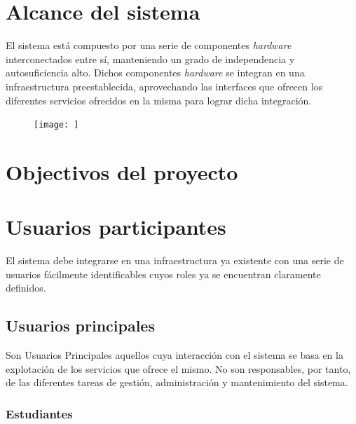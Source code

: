 \documentclass{article}
\begin{document}



\section{Alcance del sistema}

El sistema está compuesto por una serie de componentes \textit{hardware} interconectados entre sí, manteniendo un grado de independencia y autosuficiencia alto. Dichos componentes \textit{hardware} se integran en una infraestructura preestablecida, aprovechando las interfaces que ofrecen los diferentes servicios ofrecidos en la misma para lograr dicha integración.

\begin{figure}[H]
\texttt{[image: ]}
\caption{}
\label{Diagrama general del sistema}
\end{figure}

\section{Objectivos del proyecto}


\section{Usuarios participantes}

El sistema debe integrarse en una infraestructura ya existente con una serie de usuarios fácilmente identificables cuyos roles ya se encuentran claramente definidos.

\subsection{Usuarios principales}

Son Usuarios Principales aquellos cuya interacción con el sistema se basa en la explotación de los servicios que ofrece el mismo. No son responsables, por tanto, de las diferentes tareas de gestión, administración y mantenimiento del sistema.

\subsubsection{Estudiantes}
\end{document}
